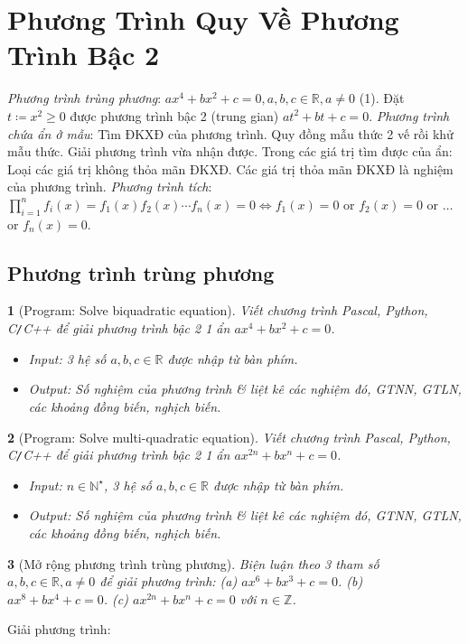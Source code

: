 \documentclass{article}
\newtheorem{baitoan}{}
\begin{document}
\section{Phương Trình Quy Về Phương Trình Bậc 2}
 \textit{Phương trình trùng phương}: $ax^4 + bx^2 + c = 0,a,b,c\in\mathbb{R},a\ne0$ (1). Đặt $t\coloneqq x^2\ge0$ được phương trình bậc 2 (trung gian) $at^2 + bt + c = 0$.  \textit{Phương trình chứa ẩn ở mẫu}: Tìm ĐKXĐ của phương trình. Quy đồng mẫu thức 2 vế rồi khử mẫu thức. Giải phương trình vừa nhận được. Trong các giá trị tìm được của ẩn: Loại các giá trị không thỏa mãn ĐKXĐ. Các giá trị thỏa mãn ĐKXĐ là nghiệm của phương trình.  \textit{Phương trình tích}: $\prod_{i=1}^n f_i(x) = f_1(x)f_2(x)\cdots f_n(x) = 0\Leftrightarrow f_1(x) = 0$ or $f_2(x) = 0$ or $\ldots$ or $f_n(x) = 0$.

\subsection{Phương trình trùng phương}

\begin{baitoan}[{\sf Program}: Solve biquadratic equation]
	Viết chương trình {\sf Pascal, Python, C{\tt/}C++} để giải phương trình bậc 2 1 ẩn $ax^4 + bx^2 + c = 0$.
	\begin{itemize}
		\item {\sf Input}: 3 hệ số $a,b,c\in\mathbb{R}$ được nhập từ bàn phím.
		\item {\sf Output}: Số nghiệm của phương trình \& liệt kê các nghiệm đó, {\rm GTNN, GTLN}, các khoảng đồng biến, nghịch biến.
	\end{itemize}
\end{baitoan}

\begin{baitoan}[{\sf Program}: Solve multi-quadratic equation]
	Viết chương trình {\sf Pascal, Python, C{\tt/}C++} để giải phương trình bậc 2 1 ẩn $ax^{2n} + bx^n + c = 0$.
	\begin{itemize}
		\item {\sf Input}: $n\in\mathbb{N}^\star$, 3 hệ số $a,b,c\in\mathbb{R}$ được nhập từ bàn phím.
		\item {\sf Output}: Số nghiệm của phương trình \& liệt kê các nghiệm đó, {\rm GTNN, GTLN}, các khoảng đồng biến, nghịch biến.
	\end{itemize}
\end{baitoan}

\begin{baitoan}[Mở rộng phương trình trùng phương]
	Biện luận theo 3 tham số $a,b,c\in\mathbb{R},a\ne0$ để giải phương trình: (a) $ax^6 + bx^3 + c = 0$. (b) $ax^8 + bx^4 + c = 0$. (c) $ax^{2n} + bx^n + c = 0$ với $n\in\mathbb{Z}$.
\end{baitoan}
Giải phương trình:
\end{document}

